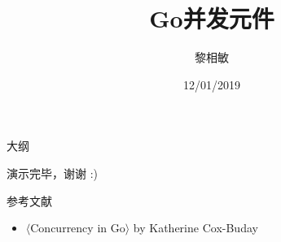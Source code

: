 \documentclass{beamer}
\title{Go并发元件}
\author{黎相敏}
\institute{上海观源信息科技有限公司 \\ 上海市闵行区紫竹科技园4号楼303B}
\date{12/01/2019}
\begin{document}
    \begin{frame}
        \maketitle
    \end{frame}

    \begin{frame}{大纲}
        \tableofcontents
    \end{frame}

    

    
    
    
    
    
    
    
    
    

    \begin{frame}[focus]
        演示完毕，谢谢 :)
    \end{frame}

    \appendix
    \begin{frame}{参考文献}
        \begin{itemize}
            \item \(\langle\)Concurrency in Go\(\rangle\) by Katherine Cox-Buday
        \end{itemize}
    \end{frame}
\end{document}
